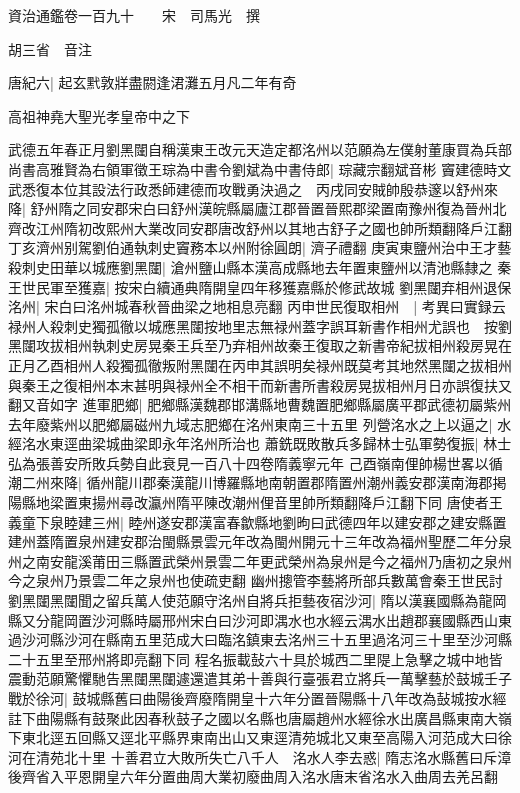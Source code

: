 資治通鑑卷一百九十　　宋　司馬光　撰

胡三省　音注

唐紀六|{
	起玄黓敦牂盡閼逢涒灘五月凡二年有奇}


高祖神堯大聖光孝皇帝中之下

武德五年春正月劉黑闥自稱漢東王改元天造定都洺州以范願為左僕射董康買為兵部尚書高雅賢為右領軍徵王琮為中書令劉斌為中書侍郎|{
	琮藏宗翻斌音彬}
竇建德時文武悉復本位其設法行政悉師建德而攻戰勇決過之　丙戌同安賊帥殷恭邃以舒州來降|{
	舒州隋之同安郡宋白曰舒州漢皖縣屬廬江郡晉置晉熙郡梁置南豫州復為晉州北齊改江州隋初改熙州大業改同安郡唐改舒州以其地古舒子之國也帥所類翻降戶江翻}
丁亥濟州别駕劉伯通執刺史竇務本以州附徐圓朗|{
	濟子禮翻}
庚寅東鹽州治中王才藝殺刺史田華以城應劉黑闥|{
	滄州鹽山縣本漢高成縣地去年置東鹽州以清池縣隸之}
秦王世民軍至獲嘉|{
	按宋白續通典隋開皇四年移獲嘉縣於修武故城}
劉黑闥弃相州退保洺州|{
	宋白曰洺州城春秋晉曲梁之地相息亮翻}
丙申世民復取相州　|{
	考異曰實録云禄州人殺刺史獨孤徹以城應黑闥按地里志無禄州蓋字誤耳新書作相州尤誤也　按劉黑闥攻拔相州執刺史房晃秦王兵至乃弃相州故秦王復取之新書帝紀拔相州殺房晃在正月乙酉相州人殺獨孤徹叛附黑闥在丙申其誤明矣禄州既莫考其地然黑闥之拔相州與秦王之復相州本末甚明與禄州全不相干而新書所書殺房晃拔相州月日亦誤復扶又翻又音如字}
進軍肥鄉|{
	肥鄉縣漢魏郡邯溝縣地曹魏置肥鄉縣屬廣平郡武德初屬紫州去年廢紫州以肥鄉屬磁州九域志肥鄉在洺州東南三十五里}
列營洺水之上以逼之|{
	水經洺水東逕曲梁城曲梁即永年洺州所治也}
蕭銑既敗散兵多歸林士弘軍勢復振|{
	林士弘為張善安所敗兵勢自此衰見一百八十四卷隋義寧元年}
己酉嶺南俚帥楊世畧以循潮二州來降|{
	循州龍川郡秦漢龍川博羅縣地南朝置郡隋置州潮州義安郡漢南海郡掲陽縣地梁置東揚州尋改瀛州隋平陳改潮州俚音里帥所類翻降戶江翻下同}
唐使者王義童下泉睦建三州|{
	睦州遂安郡漢富春歙縣地劉昫曰武德四年以建安郡之建安縣置建州蓋隋置泉州建安郡治閩縣景雲元年改為閩州開元十三年改為福州聖歷二年分泉州之南安龍溪莆田三縣置武榮州景雲二年更武榮州為泉州是今之福州乃唐初之泉州今之泉州乃景雲二年之泉州也使疏吏翻}
幽州摠管李藝將所部兵數萬會秦王世民討劉黑闥黑闥聞之留兵萬人使范願守洺州自將兵拒藝夜宿沙河|{
	隋以漢襄國縣為龍岡縣又分龍岡置沙河縣時屬邢州宋白曰沙河即湡水也水經云湡水出趙郡襄國縣西山東過沙河縣沙河在縣南五里范成大曰臨洺鎮東去洺州三十五里過洺河三十里至沙河縣二十五里至邢州將即亮翻下同}
程名振載鼔六十具於城西二里隄上急擊之城中地皆震動范願驚懼馳告黑闥黑闥遽還遣其弟十善與行臺張君立將兵一萬擊藝於鼓城壬子戰於徐河|{
	鼓城縣舊曰曲陽後齊廢隋開皇十六年分置晉陽縣十八年改為鼔城按水經註下曲陽縣有鼓聚此因春秋鼓子之國以名縣也唐屬趙州水經徐水出廣昌縣東南大嶺下東北逕五回縣又逕北平縣界東南出山又東逕清苑城北又東至高陽入河范成大曰徐河在清苑北十里}
十善君立大敗所失亡八千人　洺水人李去惑|{
	隋志洺水縣舊曰斥漳後齊省入平恩開皇六年分置曲周大業初廢曲周入洺水唐末省洺水入曲周去羌呂翻}
